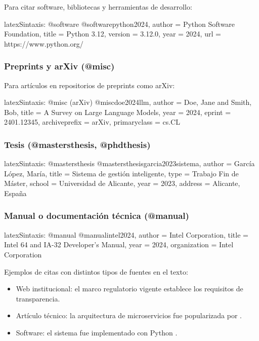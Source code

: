 Para citar software, bibliotecas y herramientas de desarrollo:

\begin{codigosimple}{latex}{Sintaxis: @software}
@software{python2024,
  author  = {{Python Software Foundation}},
  title   = {Python 3.12},
  version = {3.12.0},
  year    = {2024},
  url     = {https://www.python.org/}
}
\end{codigosimple}

\subsubsection{Preprints y arXiv (@misc)}

Para artículos en repositorios de preprints como arXiv:

\begin{codigosimple}{latex}{Sintaxis: @misc (arXiv)}
@misc{doe2024llm,
  author        = {Doe, Jane and Smith, Bob},
  title         = {A Survey on Large Language Models},
  year          = {2024},
  eprint        = {2401.12345},
  archiveprefix = {arXiv},
  primaryclass  = {cs.CL}
}
\end{codigosimple}

\subsubsection{Tesis (@mastersthesis, @phdthesis)}

\begin{codigosimple}{latex}{Sintaxis: @mastersthesis}
@mastersthesis{garcia2023sistema,
  author  = {García López, María},
  title   = {Sistema de gestión inteligente},
  type    = {Trabajo Fin de Máster},
  school  = {Universidad de Alicante},
  year    = {2023},
  address = {Alicante, España}
}
\end{codigosimple}

\subsubsection{Manual o documentación técnica (@manual)}

\begin{codigosimple}{latex}{Sintaxis: @manual}
@manual{intel2024,
  author       = {{Intel Corporation}},
  title        = {Intel 64 and IA-32 Developer's Manual},
  year         = {2024},
  organization = {Intel Corporation}
}
\end{codigosimple}

Ejemplos de citas con distintos tipos de fuentes en el texto:
\begin{itemize}
  \item Web institucional: el marco regulatorio vigente \parencite{europarl2023}
    establece los requisitos de transparencia.
  \item Artículo técnico: la arquitectura de microservicios fue popularizada
    por \textcite{fowler2023microservices}.
  \item Software: el sistema fue implementado con Python \parencite{python2024}.
\end{itemize}

